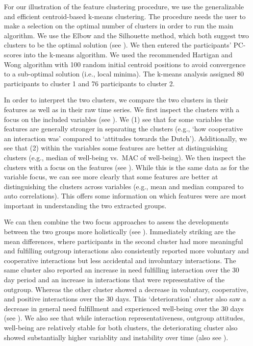 For our illustration of the feature clustering procedure, we use the
generalizable and efficient centroid-based k-means clustering. The
procedure needs the user to make a selection on the optimal number of
clusters in order to run the main algorithm. We use the Elbow and the
Silhouette method, which both suggest two clusters to be the optimal
solution (see ). We then entered the participants'
PC-scores into the k-means algorithm. We used the recommended Hartigan
and Wong algorithm \citep{hartigan1979} with 100 random initial centroid
positions to avoid convergence to a sub-optimal solution (i.e., local
minima). The k-means analysis assigned 80 participants to cluster 1 and
76 participants to cluster 2.

In order to interpret the two clusters, we compare the two clusters in
their features as well as in their raw time series. We first inspect the
clusters with a focus on the included variables (see ).
We (1) see that for some variables the features are generally stronger
in separating the clusters (e.g., `how cooperative an interaction was'
compared to `attitudes towards the Dutch'). Additionally, we see that
(2) within the variables some features are better at distinguishing
clusters (e.g., median of well-being vs.~MAC of well-being). We then
inspect the clusters with a focus on the features (see ).
While this is the same data as for the variable focus, we can see more
clearly that some features are better at distinguishing the clusters
across variables (e.g., mean and median compared to auto correlations).
This offers some information on which features were are most important
in understanding the two extracted groups.

We can then combine the two focus approaches to assess the developments
between the two groups more holistically (see ).
Immediately striking are the mean differences, where participants in the
second cluster had more meaningful and fulfilling outgroup interactions
also consistently reported more voluntary and cooperative interactions
but less accidental and involuntary interactions. The same cluster also
reported an increase in need fulfilling interaction over the 30 day
period and an increase in interactions that were representative of the
outgroup. Whereas the other cluster showed a decrease in voluntary,
cooperative, and positive interactions over the 30 days. This
`deterioration' cluster also saw a decrease in general need fulfillment
and experienced well-being over the 30 days (see ). We
also see that while interaction representativeness, outgroup attitudes,
well-being are relatively stable for both clusters, the deteriorating
cluster also showed substantially higher variablity and instability over
time (also see ).

